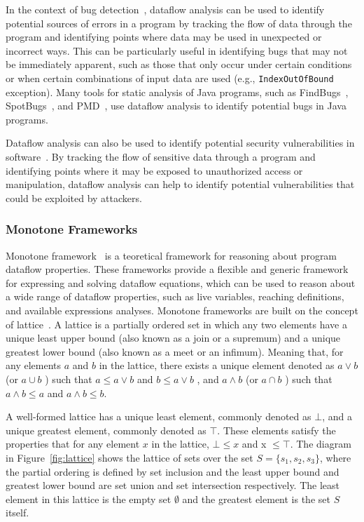 In the context of bug detection~\cite{spoon, fink2012wala}, dataflow analysis can be used to identify
potential sources of errors in a program by tracking the flow of data through
the program and identifying points where data may be used in unexpected or
incorrect ways. This can be particularly useful in identifying bugs that may
not be immediately apparent, such as those that only occur under certain
conditions or when certain combinations of input data are used (e.g., \texttt{IndexOutOfBound} exception).
Many tools for static analysis of Java programs, such as FindBugs~\cite{findbugs},
SpotBugs~\cite{spotbugs}, and PMD~\cite{copeland2005pmd}, use dataflow analysis to identify
potential bugs in Java programs.

Dataflow analysis can also be used to identify potential security vulnerabilities
in software~\cite{flowDroid,piskachev2021secucheck,lawall10coccinelle}. By tracking the flow of sensitive data through a program and
identifying points where it may be exposed to unauthorized access or manipulation,
dataflow analysis can help to identify potential vulnerabilities that could be
exploited by attackers.


\subsubsection*{Monotone Frameworks}
Monotone framework~\cite{kam1977monotone} is a teoretical framework for reasoning about program dataflow properties.
These frameworks provide a flexible and generic framework for expressing and solving
dataflow equations, which can be used to reason about a wide range of dataflow 
properties, such as live variables, reaching definitions, and available expressions analyses.
Monotone frameworks are built on the concept of lattice~\cite{Donnellan1968,Birkhoff1967,cousot1977ai}. 
A lattice is a partially ordered set in which any two elements have a unique least 
upper bound (also known as a join or a supremum) and a unique greatest lower bound 
(also known as a meet or an infimum). Meaning that, for any elements $a$ and $b$ in 
the lattice, there exists a unique element denoted as  $a \vee b$  (or  $a \cup b$ ) 
such that  $a \leq a \vee b$  and  $ b \leq a \vee b$ , and  $a \wedge b$  
(or  $ a\cap b$ ) such that  $ a\wedge b\leq a$  and  $a \wedge b\leq b$.

A well-formed lattice has a unique least element, commonly denoted as $\bot$, 
and a unique greatest element, commonly denoted as $\top$. These elements satisfy 
the properties that for any element $x$ in the lattice, $\bot \leq x$ and x $\leq \top$.
The diagram in Figure~\ref{fig:lattice} shows the lattice of sets over the set
$S = \{s_1, s_2, s_3\}$, where the partial ordering is defined by set inclusion
and the least upper bound and greatest lower bound are set union and set intersection
respectively. The least element in this lattice is the empty set $\emptyset$ and the
greatest element is the set $S$ itself. 

